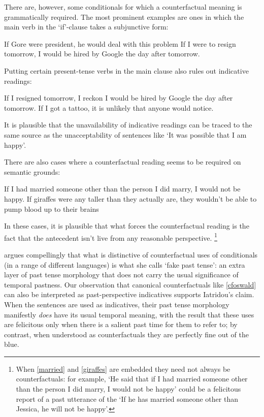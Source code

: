\documentclass[If.tex]{subfiles}
\begin{document}
There are, however, some conditionals for which a counterfactual meaning is grammatically required. The most prominent examples are ones in which the main verb in the ‘if’-clause takes a subjunctive form:
\begin{prop}
	\nitem 
		\begin{prop}
			\aitem
			If Gore were president, he would deal with this problem
			\aitem 
			If I were to resign tomorrow, I would be hired by Google the day after tomorrow.
		\end{prop}
\end{prop}
Putting certain present-tense verbs in the main clause also rules out indicative readings:
\begin{prop}
	\nitem
	\begin{prop}
		\aitem
		If I resigned tomorrow, I reckon I would be hired by Google the day after tomorrow.
		\aitem 
		If I got a tattoo, it is unlikely that anyone would notice.
	\end{prop}
\end{prop}
It is plausible that the unavailability of indicative readings can be traced to the same source as the unacceptability of sentences like ‘It was possible that I am happy’.

There are also cases where a counterfactual reading seems to be required on semantic grounds:
\begin{prop}
	\nitem 
	\begin{prop}
		\aitem\label{married}
		If I had married someone other than the person I did marry, I would not be happy.
		\anitem \label{giraffes}
		If giraffes were any taller than they actually are, they wouldn't be able to pump blood up to their brains
	\end{prop}
\end{prop}
In these cases, it is plausible that what forces the counterfactual reading is the fact that the antecedent isn't live from any reasonable perspective.%
\footnote{When \ref{married} and \ref{giraffes} are embedded they need not always be counterfactuals: for example, ‘He said that if I had married someone other than the person I did marry, I would not be happy’ could be a felicitous report of a past utterance of the ‘If he has married someone other than Jessica, he will not be happy’.}

\citet{IatridouGIC} argues compellingly that what is distinctive of counterfactual uses of conditionals (in a range of different languages) is what she calls ‘fake past tense’: an extra layer of past tense morphology that does not carry the usual significance of temporal pastness.  Our observation that canonical counterfactuals like \ref{cfoswald} can also be interpreted as past-perspective indicatives supports Iatridou's claim.  When the sentences are used as indicatives, their past tense morphology manifestly \emph{does} have its usual temporal meaning, with the result that these uses are felicitous only when there is a salient past time for them to refer to; by contrast, when understood as counterfactuals they are perfectly fine out of the blue.  
\end{document}
